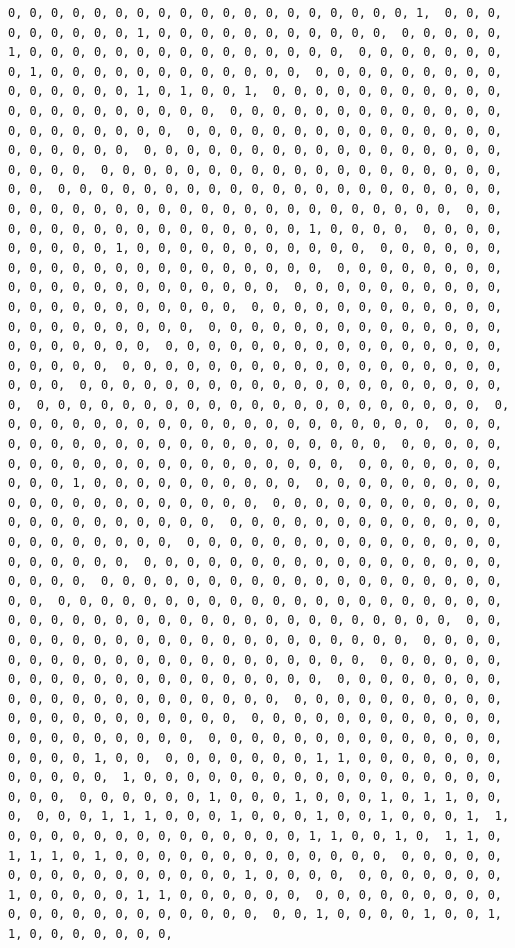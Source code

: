\documentclass[
]{article}
\begin{document}
\begin{verbatim}
0, 0, 0, 0, 0, 0, 0, 0, 0, 0, 0, 0, 0, 0, 0, 0, 0, 0, 0, 1,  0, 0, 0, 0, 0, 0, 0, 0, 0, 1, 0, 0, 0, 0, 0, 0, 0, 0, 0, 0, 0,  0, 0, 0, 0, 0, 1, 0, 0, 0, 0, 0, 0, 0, 0, 0, 0, 0, 0, 0, 0, 0,  0, 0, 0, 0, 0, 0, 0, 0, 1, 0, 0, 0, 0, 0, 0, 0, 0, 0, 0, 0, 0,  0, 0, 0, 0, 0, 0, 0, 0, 0, 0, 0, 0, 0, 0, 0, 1, 0, 1, 0, 0, 1,  0, 0, 0, 0, 0, 0, 0, 0, 0, 0, 0, 0, 0, 0, 0, 0, 0, 0, 0, 0, 0,  0, 0, 0, 0, 0, 0, 0, 0, 0, 0, 0, 0, 0, 0, 0, 0, 0, 0, 0, 0, 0,  0, 0, 0, 0, 0, 0, 0, 0, 0, 0, 0, 0, 0, 0, 0, 0, 0, 0, 0, 0, 0,  0, 0, 0, 0, 0, 0, 0, 0, 0, 0, 0, 0, 0, 0, 0, 0, 0, 0, 0, 0, 0,  0, 0, 0, 0, 0, 0, 0, 0, 0, 0, 0, 0, 0, 0, 0, 0, 0, 0, 0, 0, 0,  0, 0, 0, 0, 0, 0, 0, 0, 0, 0, 0, 0, 0, 0, 0, 0, 0, 0, 0, 0, 0,  0, 0, 0, 0, 0, 0, 0, 0, 0, 0, 0, 0, 0, 0, 0, 0, 0, 0, 0, 0, 0,  0, 0, 0, 0, 0, 0, 0, 0, 0, 0, 0, 0, 0, 0, 0, 0, 1, 0, 0, 0, 0,  0, 0, 0, 0, 0, 0, 0, 0, 0, 1, 0, 0, 0, 0, 0, 0, 0, 0, 0, 0, 0,  0, 0, 0, 0, 0, 0, 0, 0, 0, 0, 0, 0, 0, 0, 0, 0, 0, 0, 0, 0, 0,  0, 0, 0, 0, 0, 0, 0, 0, 0, 0, 0, 0, 0, 0, 0, 0, 0, 0, 0, 0, 0,  0, 0, 0, 0, 0, 0, 0, 0, 0, 0, 0, 0, 0, 0, 0, 0, 0, 0, 0, 0, 0,  0, 0, 0, 0, 0, 0, 0, 0, 0, 0, 0, 0, 0, 0, 0, 0, 0, 0, 0, 0, 0,  0, 0, 0, 0, 0, 0, 0, 0, 0, 0, 0, 0, 0, 0, 0, 0, 0, 0, 0, 0, 0,  0, 0, 0, 0, 0, 0, 0, 0, 0, 0, 0, 0, 0, 0, 0, 0, 0, 0, 0, 0, 0,  0, 0, 0, 0, 0, 0, 0, 0, 0, 0, 0, 0, 0, 0, 0, 0, 0, 0, 0, 0, 0,  0, 0, 0, 0, 0, 0, 0, 0, 0, 0, 0, 0, 0, 0, 0, 0, 0, 0, 0, 0, 0,  0, 0, 0, 0, 0, 0, 0, 0, 0, 0, 0, 0, 0, 0, 0, 0, 0, 0, 0, 0, 0,  0, 0, 0, 0, 0, 0, 0, 0, 0, 0, 0, 0, 0, 0, 0, 0, 0, 0, 0, 0, 0,  0, 0, 0, 0, 0, 0, 0, 0, 0, 0, 0, 0, 0, 0, 0, 0, 0, 0, 0, 0, 0,  0, 0, 0, 0, 0, 0, 0, 0, 0, 0, 0, 0, 0, 0, 0, 0, 0, 0, 0, 0, 0,  0, 0, 0, 0, 0, 0, 0, 0, 0, 0, 1, 0, 0, 0, 0, 0, 0, 0, 0, 0, 0,  0, 0, 0, 0, 0, 0, 0, 0, 0, 0, 0, 0, 0, 0, 0, 0, 0, 0, 0, 0, 0,  0, 0, 0, 0, 0, 0, 0, 0, 0, 0, 0, 0, 0, 0, 0, 0, 0, 0, 0, 0, 0,  0, 0, 0, 0, 0, 0, 0, 0, 0, 0, 0, 0, 0, 0, 0, 0, 0, 0, 0, 0, 0,  0, 0, 0, 0, 0, 0, 0, 0, 0, 0, 0, 0, 0, 0, 0, 0, 0, 0, 0, 0, 0,  0, 0, 0, 0, 0, 0, 0, 0, 0, 0, 0, 0, 0, 0, 0, 0, 0, 0, 0, 0, 0,  0, 0, 0, 0, 0, 0, 0, 0, 0, 0, 0, 0, 0, 0, 0, 0, 0, 0, 0, 0, 0,  0, 0, 0, 0, 0, 0, 0, 0, 0, 0, 0, 0, 0, 0, 0, 0, 0, 0, 0, 0, 0,  0, 0, 0, 0, 0, 0, 0, 0, 0, 0, 0, 0, 0, 0, 0, 0, 0, 0, 0, 0, 0,  0, 0, 0, 0, 0, 0, 0, 0, 0, 0, 0, 0, 0, 0, 0, 0, 0, 0, 0, 0, 0,  0, 0, 0, 0, 0, 0, 0, 0, 0, 0, 0, 0, 0, 0, 0, 0, 0, 0, 0, 0, 0,  0, 0, 0, 0, 0, 0, 0, 0, 0, 0, 0, 0, 0, 0, 0, 0, 0, 0, 0, 0, 0,  0, 0, 0, 0, 0, 0, 0, 0, 0, 0, 0, 0, 0, 0, 0, 0, 0, 0, 0, 0, 0,  0, 0, 0, 0, 0, 0, 0, 0, 0, 0, 0, 0, 0, 0, 0, 0, 0, 0, 0, 0, 0,  0, 0, 0, 0, 0, 0, 0, 0, 0, 0, 0, 0, 0, 0, 0, 0, 0, 0, 0, 0, 0,  0, 0, 0, 0, 0, 0, 0, 0, 0, 0, 0, 0, 0, 0, 0, 0, 0, 0, 1, 0, 0,  0, 0, 0, 0, 0, 0, 0, 1, 1, 0, 0, 0, 0, 0, 0, 0, 0, 0, 0, 0, 0,  1, 0, 0, 0, 0, 0, 0, 0, 0, 0, 0, 0, 0, 0, 0, 0, 0, 0, 0, 0, 0,  0, 0, 0, 0, 0, 0, 1, 0, 0, 0, 1, 0, 0, 0, 1, 0, 1, 1, 0, 0, 0,  0, 0, 0, 1, 1, 1, 0, 0, 0, 1, 0, 0, 0, 1, 0, 0, 1, 0, 0, 0, 1,  1, 0, 0, 0, 0, 0, 0, 0, 0, 0, 0, 0, 0, 0, 0, 1, 1, 0, 0, 1, 0,  1, 1, 0, 1, 1, 1, 0, 1, 0, 0, 0, 0, 0, 0, 0, 0, 0, 0, 0, 0, 0,  0, 0, 0, 0, 0, 0, 0, 0, 0, 0, 0, 0, 0, 0, 0, 0, 1, 0, 0, 0, 0,  0, 0, 0, 0, 0, 0, 0, 1, 0, 0, 0, 0, 0, 1, 1, 0, 0, 0, 0, 0, 0,  0, 0, 0, 0, 0, 0, 0, 0, 0, 0, 0, 0, 0, 0, 0, 0, 0, 0, 0, 0, 0,  0, 0, 1, 0, 0, 0, 0, 1, 0, 0, 1, 1, 0, 0, 0, 0, 0, 0, 0, 
\end{verbatim}
\end{document}
